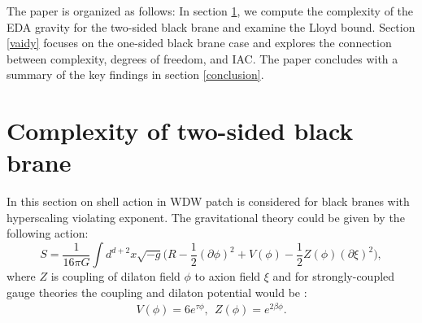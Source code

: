\documentclass[]{article}
\begin{document}
The paper is organized as follows: In section \ref{sectwo}, we compute the complexity of the EDA gravity for the two-sided black brane and examine the Lloyd bound. Section \ref{vaidy} focuses on the one-sided black brane case and explores the connection between complexity, degrees of freedom, and IAC. The paper concludes with a summary of the key findings in section \ref{conclusion}.\\

\section{Complexity of two-sided black brane}\label{sectwo}
In this section on shell action in WDW patch is considered for black branes with hyperscaling violating exponent. The gravitational theory could be given by the following action:
\begin{equation}
S=\frac{1}{16\pi G}\int d^{d+2}x \sqrt{-g}\Big(R-\frac{1}{2}(\partial \phi)^2+V(\phi)-\frac{1}{2}Z(\phi)(\partial \xi)^2\Big), \label{action}
\end{equation}
where $Z$ is coupling of dilaton field $\phi$ to axion field $\xi$ and for strongly-coupled gauge theories the coupling and dilaton potential would be \cite{strong}:
\begin{align}
V(\phi)=6e^{\tau \phi},~~Z(\phi)=e^{2\beta \phi}.
\end{align}
\end{document}
